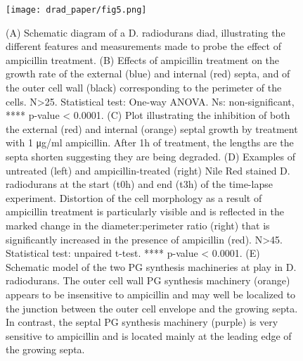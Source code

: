 \begin{figure}[ht]
    \centering
    \texttt{[image: drad\_paper/fig5.png]}
    \label{drad_fig5}
\end{figure}
\begin{figure}[ht]
    \ContinuedFloat
    \caption[]{(A) Schematic diagram of a D. radiodurans diad, illustrating the different features and measurements made to probe the effect of ampicillin treatment. (B) Effects of ampicillin treatment on the growth rate of the external (blue) and internal (red) septa, and of the outer cell wall (black) corresponding to the perimeter of the cells. N>25. Statistical test: One-way ANOVA. Ns: non-significant, **** p-value < 0.0001. (C) Plot illustrating the inhibition of both the external (red) and internal (orange) septal growth by treatment with 1 μg/ml ampicillin. After 1h of treatment, the lengths are the septa shorten suggesting they are being degraded. (D) Examples of untreated (left) and ampicillin-treated (right) Nile Red stained D. radiodurans at the start (t0h) and end (t3h) of the time-lapse experiment. Distortion of the cell morphology as a result of ampicillin treatment is particularly visible and is reflected in the marked change in the diameter:perimeter ratio (right) that is significantly increased in the presence of ampicillin (red). N>45. Statistical test: unpaired t-test. **** p-value < 0.0001. (E) Schematic model of the two PG synthesis machineries at play in D. radiodurans. The outer cell wall PG synthesis machinery (orange) appears to be insensitive to ampicillin and may well be localized to the junction between the outer cell envelope and the growing septa. In contrast, the septal PG synthesis machinery (purple) is very sensitive to ampicillin and is located mainly at the leading edge of the growing septa.}
\end{figure}

